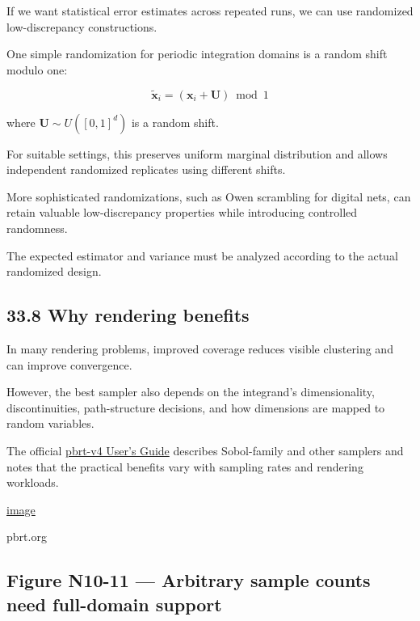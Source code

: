 If we want statistical error estimates across repeated runs, we can use randomized low-discrepancy constructions.

One simple randomization for periodic integration domains is a random shift modulo one:

\[ \boxed{ \tilde{\mathbf x}_i = (\mathbf x_i+\mathbf U)\bmod1 } \]

where \(\mathbf U\sim U([0,1]^d)\) is a random shift.

For suitable settings, this preserves uniform marginal distribution and allows independent randomized replicates using different shifts.

More sophisticated randomizations, such as Owen scrambling for digital nets, can retain valuable low-discrepancy properties while introducing controlled randomness.

The expected estimator and variance must be analyzed according to the actual randomized design.

\subsection{33.8 Why rendering benefits}\label{02-foundations-ii-ch031-why-rendering-benefits}

\hypertarget{02-foundations-ii-ch031-why-rendering-benefits}{}

In many rendering problems, improved coverage reduces visible clustering and can improve convergence.

However, the best sampler also depends on the integrand's dimensionality, discontinuities, path-structure decisions, and how dimensions are mapped to random variables.

The official \href{https://www.pbrt.org/users-guide-v4?utm_source=chatgpt.com}{pbrt-v4 User's Guide} describes Sobol-family and other samplers and notes that the practical benefits vary with sampling rates and rendering workloads. 

\href{https://www.google.com/s2/favicons?domain=https://www.pbrt.org&sz=32}{image}

pbrt.org

\subsection{Figure N10-11 --- Arbitrary sample counts need full-domain support}\label{02-foundations-ii-ch031-figure-n10-11-arbitrary-sample-counts-need-full-domain-support}

\hypertarget{02-foundations-ii-ch031-figure-n10-11-arbitrary-sample-counts-need-full-domain-support}{}


